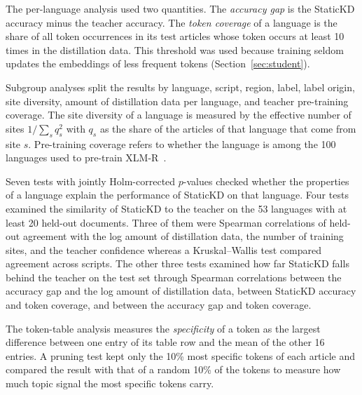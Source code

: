 \documentclass{ieeeaccess}
\begin{document}
The per-language analysis used two quantities. The \emph{accuracy gap} is the StaticKD accuracy minus the teacher accuracy. The \emph{token coverage} of a language is the share of all token occurrences in its test articles whose token occurs at least 10 times in the distillation data. This threshold was used because training seldom updates the embeddings of less frequent tokens (Section~\ref{sec:student}).

Subgroup analyses split the results by language, script, region, label, label origin, site diversity, amount of distillation data per language, and teacher pre-training coverage. The site diversity of a language is measured by the effective number of sites $1/\sum_s q_s^{2}$ with $q_s$ as the share of the articles of that language that come from site $s$. Pre-training coverage refers to whether the language is among the 100 languages used to pre-train XLM-R~\cite{conneau2020xlmr}.

Seven tests with jointly Holm-corrected $p$-values checked whether the properties of a language explain the performance of StaticKD on that language. Four tests examined the similarity of StaticKD to the teacher on the 53 languages with at least 20 held-out documents. Three of them were Spearman correlations of held-out agreement with the log amount of distillation data, the number of training sites, and the teacher confidence whereas a Kruskal--Wallis test compared agreement across scripts. The other three tests examined how far StaticKD falls behind the teacher on the test set through Spearman correlations between the accuracy gap and the log amount of distillation data, between StaticKD accuracy and token coverage, and between the accuracy gap and token coverage.

The token-table analysis measures the \emph{specificity} of a token as the largest difference between one entry of its table row and the mean of the other 16 entries. A pruning test kept only the 10\% most specific tokens of each article and compared the result with that of a random 10\% of the tokens to measure how much topic signal the most specific tokens carry.
\end{document}
